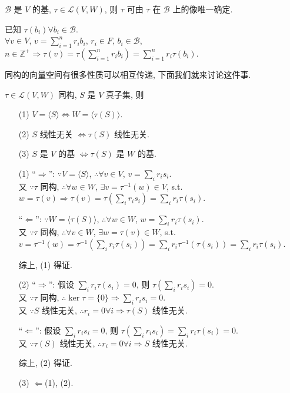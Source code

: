 \documentclass{note}
\begin{document}
\begin{thm}[(课本定理 2.2)]\label{thm-2.4}
    $\mathcal{B}$ 是 $V$ 的基, $\tau\in\mathcal{L}(V,W)$, 则 $\tau$ 可由 $\tau$ 在 $\mathcal{B}$ 上的像唯一确定.
\end{thm}
\begin{pf}
    已知 $\tau(b_i)\forall b_i\in\mathcal{B}$.\\
    $\forall v\in V$, $v=\sum_{i=1}^nr_ib_i$, $r_i\in F$, $b_i\in\mathcal{B}$, $n\in\mathbb{Z}^+\Longrightarrow\tau(v)=\tau\left(\sum_{i=1}^nr_ib_i\right)=\sum_{i=1}^nr_i\tau(b_i)$.
\end{pf}

同构的向量空间有很多性质可以相互传递, 下面我们就来讨论这件事.

\begin{thm}[(课本定理 2.4)]
    $\tau\in\mathcal{L}(V,W)$ 同构, $S$ 是 $V$ 真子集, 则
    \begin{itemize}
        \item[(1)] $V=\langle S\rangle\Longleftrightarrow W=\langle\tau(S)\rangle$.
        \item[(2)] $S$ 线性无关 $\Longleftrightarrow\tau(S)$ 线性无关.
        \item[(3)] $S$ 是 $V$ 的基 $\Longleftrightarrow\tau(S)$ 是 $W$ 的基.
    \end{itemize}
\end{thm}
\begin{pf}
    \begin{itemize}
        \item[(1)] ``$\Longrightarrow$'': $\because V=\langle S\rangle$, $\therefore\forall v\in V$, $v=\sum_ir_is_i$.\\
        又 $\because\tau$ 同构, $\therefore\forall w\in W$, $\exists v=\tau^{-1}(w)\in V$, s.t. $w=\tau(v)\Longrightarrow\tau(v)=\tau\left(\sum_ir_is_i\right)=\sum_ir_i\tau(s_i)$.

        ``$\Longleftarrow$'': $\because W=\langle\tau(S)\rangle$, $\therefore\forall w\in W$, $w=\sum_ir_i\tau(s_i)$.\\
        又 $\because\tau$ 同构, $\therefore\forall v\in W$, $\exists w=\tau(v)\in W$, s.t. $v=\tau^{-1}(w)=\tau^{-1}\left(\sum_ir_i\tau(s_i)\right)=\sum_ir_i\tau^{-1}(\tau(s_i))=\sum_ir_i\tau(s_i)$.

        综上, (1) 得证.
        \item[(2)] ``$\Longrightarrow$'': 假设 $\sum_ir_i\tau(s_i)=0$, 则 $\tau\left(\sum_ir_is_i\right)=0$.\\
        又 $\because\tau$ 同构, $\therefore\ker\tau=\{0\}\Longrightarrow\sum_ir_is_i=0$.\\
        又 $\because S$ 线性无关, $\therefore r_i=0\forall i\Longrightarrow\tau(S)$ 线性无关.

        ``$\Longleftarrow$'': 假设 $\sum_ir_is_i=0$, 则 $\tau\left(\sum_ir_is_i\right)=\sum_ir_i\tau(s_i)=0$.\\
        又 $\because\tau(S)$ 线性无关, $\therefore r_i=0\forall i\Longrightarrow S$ 线性无关.

        综上, (2) 得证.
        \item[(3)] $\Longleftarrow$(1), (2).
    \end{itemize}
\end{pf}
\end{document}
